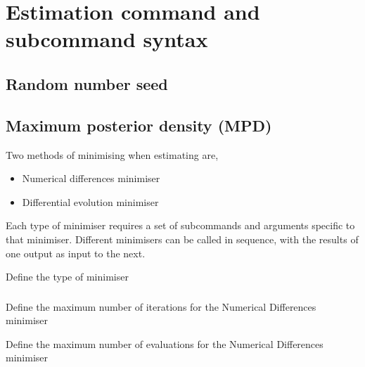\section{Estimation command and subcommand syntax\label{sec:estimation-syntax}}

\subsection{Random number seed}



\subsection{Maximum posterior density (MPD)}

Two methods of minimising when estimating are, 
 
\begin{itemize}
	\item Numerical differences minimiser
  \item Differential evolution minimiser
\end{itemize}

Each type of minimiser requires a set of subcommands and arguments specific to that minimiser. Different minimisers can be called in sequence, with the results of one output as input to the next.


 {Define the type of minimiser}

\subsubsection[Numerical differences minimiser]{} 

 {Define the maximum number of iterations for the Numerical Differences minimiser}

 {Define the maximum number of evaluations for the Numerical Differences minimiser}

